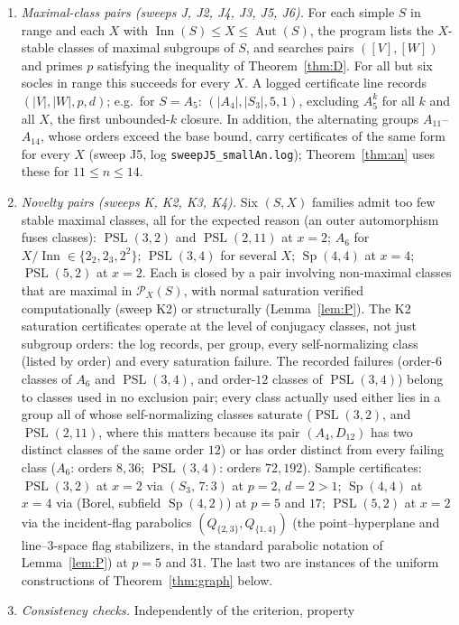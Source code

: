 \documentclass[11pt]{amsart}
\theoremstyle{definition}
\theoremstyle{remark}
\DeclareMathOperator{\Inn}{Inn}
\DeclareMathOperator{\Aut}{Aut}
\DeclareMathOperator{\PSL}{PSL}
\DeclareMathOperator{\Sp}{Sp}
\newcommand{\Pos}{\mathcal{P}}
\begin{document}
\begin{enumerate}
\item \emph{Maximal-class pairs (sweeps J, J2, J4, J3, J5, J6).} For each
simple $S$ in range and each $X$ with $\Inn(S)\leq X\leq\Aut(S)$, the
program lists the $X$-stable classes of maximal subgroups of $S$, and
searches pairs $([V],[W])$ and primes $p$ satisfying the inequality of
Theorem~\ref{thm:D}. For all but six socles in range this succeeds for
every $X$. A logged certificate line records
$(|V|,|W|,p,d)$; e.g.\ for $S=A_5$: $(|A_4|,|S_3|,5,1)$, excluding
$A_5^k$ for all $k$ and all $X$, the first unbounded-$k$ closure. In
addition, the alternating groups $A_{11}$--$A_{14}$, whose orders
exceed the base bound, carry certificates of the same form for every
$X$ (sweep J5, log \texttt{sweepJ5\_smallAn.log}); Theorem~\ref{thm:an}
uses these for $11\leq n\leq14$.
\item \emph{Novelty pairs (sweeps K, K2, K3, K4).} Six $(S,X)$ families
admit too few stable maximal classes, all for the expected reason (an
outer automorphism fuses classes): $\PSL(3,2)$ and $\PSL(2,11)$ at
$x=2$; $A_6$ for $X/\Inn\in\{2_2,2_3,2^2\}$; $\PSL(3,4)$ for several
$X$; $\Sp(4,4)$ at $x=4$; $\PSL(5,2)$ at $x=2$. Each is closed by a pair
involving non-maximal classes that are maximal in $\Pos_X(S)$, with
normal saturation verified computationally (sweep K2) or structurally
(Lemma~\ref{lem:P}). The K2 saturation certificates operate at the
level of conjugacy classes, not just subgroup orders: the log records,
per group, every self-normalizing class (listed by order) and every
saturation failure. The recorded failures (order-$6$ classes of
$A_6$ and $\PSL(3,4)$, and order-$12$ classes of $\PSL(3,4)$) belong
to classes used in no exclusion pair; every class actually used either
lies in a group all of whose self-normalizing classes saturate
($\PSL(3,2)$, and $\PSL(2,11)$, where this matters because its pair
$(A_4,D_{12})$ has two distinct classes of the same order $12$) or has
order distinct from every failing class ($A_6$: orders $8,36$;
$\PSL(3,4)$: orders $72,192$). Sample certificates: $\PSL(3,2)$ at
$x=2$ via $(S_3,\,7{:}3)$ at $p=2$, $d=2>1$; $\Sp(4,4)$ at $x=4$ via
(Borel,
subfield $\Sp(4,2)$) at $p=5$ and $17$; $\PSL(5,2)$ at $x=2$ via the
incident-flag parabolics $(Q_{\{2,3\}},Q_{\{1,4\}})$ (the
point--hyperplane and line--$3$-space flag stabilizers, in the standard
parabolic notation of Lemma~\ref{lem:P}) at $p=5$ and $31$. The last
two are
instances of the uniform constructions of Theorem~\ref{thm:graph} below.
\item \emph{Consistency checks.} Independently of the criterion, property

\end{enumerate}
\end{document}
